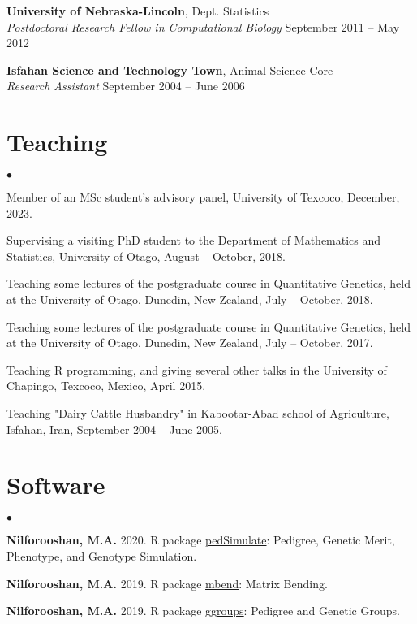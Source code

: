 \documentclass[margin,line]{res}
\newenvironment{list2}{
  \begin{list}{$\bullet$}{%
      \setlength{\itemsep}{0in}
      \setlength{\parsep}{0in} \setlength{\parskip}{0in}
      \setlength{\topsep}{0in} \setlength{\partopsep}{0in}
      \setlength{\leftmargin}{0.2in}}}{\end{list}}
\begin{document}
\begin{resume}
  {\bf University of Nebraska-Lincoln}, Dept. Statistics \\
  {\em Postdoctoral Research Fellow in Computational Biology} \hfill{September 2011 -- May 2012}

  {\bf Isfahan Science and Technology Town}, Animal Science Core \\
  {\em Research Assistant} \hfill{September 2004 -- June 2006}
  \section{\sc Teaching}

  \begin{list2}
    \item Member of an MSc student's advisory panel, University of Texcoco, December, 2023.
    \item Supervising a visiting PhD student to the Department of Mathematics and Statistics, University of Otago, August -- October, 2018.
    \item Teaching some lectures of the postgraduate course in Quantitative Genetics, held at the University of Otago, Dunedin, New Zealand, July -- October, 2018.
    \item Teaching some lectures of the postgraduate course in Quantitative Genetics, held at the University of Otago, Dunedin, New Zealand, July -- October, 2017.
    \item Teaching R programming, and giving several other talks in the University of Chapingo, Texcoco, Mexico, April 2015.
    \item Teaching "Dairy Cattle Husbandry" in Kabootar-Abad school of Agriculture, Isfahan, Iran, September 2004 -- June 2005.
  \end{list2}
  \section{\sc Software}

  \begin{list2}
    \item {\bf Nilforooshan, M.A.} 2020. R package \href{https://CRAN.R-project.org/package=pedSimulate}{pedSimulate}: Pedigree, Genetic Merit, Phenotype, and Genotype Simulation. \\
    \item {\bf Nilforooshan, M.A.} 2019. R package \href{https://CRAN.R-project.org/package=mbend}{mbend}: Matrix Bending. \\
    \item {\bf Nilforooshan, M.A.} 2019. R package \href{https://CRAN.R-project.org/package=ggroups}{ggroups}: Pedigree and Genetic Groups.
  \end{list2}

\end{resume}
\end{document}
